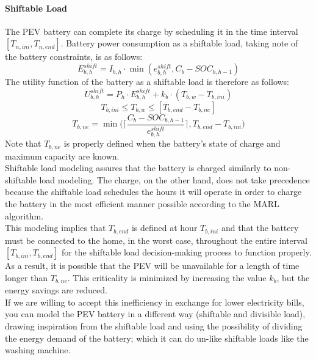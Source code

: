 \paragraph{Shiftable Load}
The PEV battery can complete its charge by scheduling it in the time interval $[T_{n,ini}, T_{n,end}]$. Battery power consumption as a shiftable load, taking note of the battery constraints, is as follows:
\begin{equation}
E^{shift}_{b,h} = I_{b,h} \cdot \min(e^{shift}_{b,h}, C_b - SOC_{b,h-1})
\end{equation}
The utility function of the battery as a shiftable load is therefore as follows:
\begin{equation}
    U^{shift}_{b,h} = P_h \cdot E^{shift}_{b,h}+k_b \cdot (T_{b,w}-T_{b,ini})
\end{equation}
\begin{equation}
    T_{b,ini} \leq T_{b,w} \leq [T_{b,end}-T_{b,ne}]
\end{equation}
\begin{equation}
    T_{b,ne} = \min \Bigg( \Bigg \lceil \frac{C_b - SOC_{b,h-1}}{e^{shift}_{b,h}} \Bigg \rceil, T_{b,end}-T_{b,ini} \Bigg)
\end{equation}
Note that $T_{b,ne}$ is properly defined when the battery's state of charge and maximum capacity are known.\\
Shiftable load modeling assures that the battery is charged similarly to non-shiftable load modeling. The charge, on the other hand, does not take precedence because the shiftable load schedules the hours it will operate in order to charge the battery in the most efficient manner possible according to the MARL algorithm.\\
This modeling implies that $T_{b,end}$ is defined at hour $T_{b,ini}$ and that the battery must be connected to the home, in the worst case, throughout the entire interval $[T_{b,ini}, T_{b,end}]$ for the shiftable load decision-making process to function properly. As a result, it is possible that the PEV will be unavailable for a length of time longer than $T_{b,ne}$. This criticality is minimized by increasing the value $k_b$, but the energy savings are reduced.\\
If we are willing to accept this inefficiency in exchange for lower electricity bills, you can model the PEV battery in a different way (shiftable and divisible load), drawing inspiration from the shiftable load and using the possibility of dividing the energy demand of the battery; which it can do un-like shiftable loads like the washing machine.



